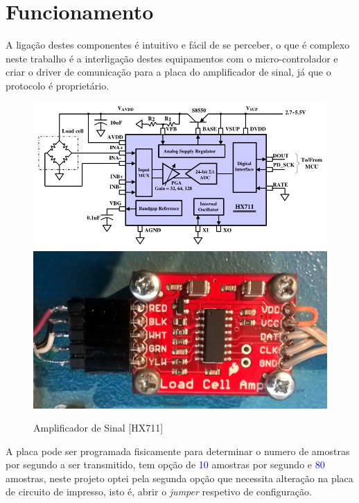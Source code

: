 \section{Funcionamento}
A ligação destes componentes é intuitivo e fácil de se perceber, o que é complexo neste trabalho é a interligação destes equipamentos com o micro-controlador e criar o driver de comunicação para a placa do amplificador de sinal, já que o protocolo é proprietário.
\begin{figure}[H]
	\captionsetup{justification=raggedright,singlelinecheck=false}
	\centering
	\includegraphics[scale=0.35]{./image/PESTA/schematic/HX711_Schematic_1.jpg}
	\includegraphics[scale=0.1]{./image/PESTA/material/HX711_board_1.jpg}
	\caption{Amplificador de Sinal [HX711]}
	\label{HX711_Schematic_1}
\end{figure}
A placa pode ser programada fisicamente para determinar o numero de amostras por segundo a ser transmitido, tem opção de \textcolor{blue}{10} amostras por segundo e \textcolor{blue}{80} amostras, neste projeto optei pela segunda opção que necessita alteração na placa de circuito de impresso, isto é, abrir o \textit{jumper} respetivo de configuração.

